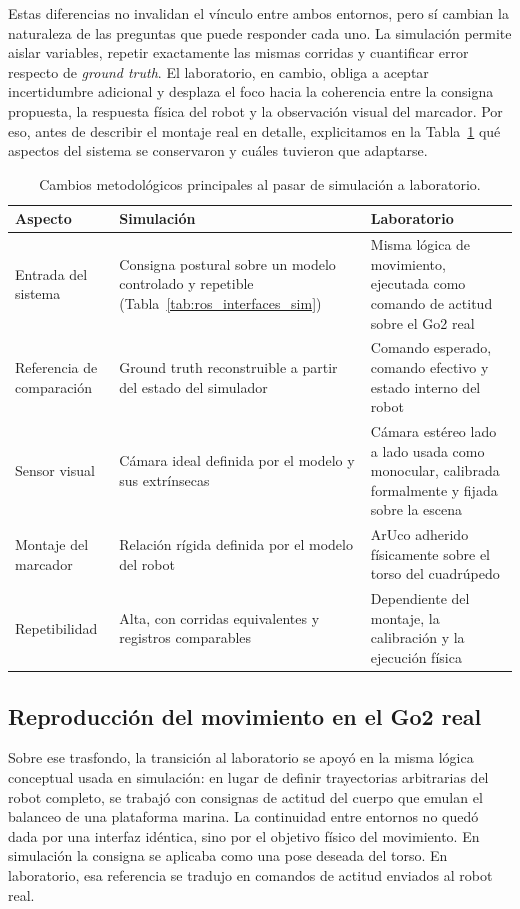 \documentclass[12pt,a4paper]{report}
\begin{document}
Estas diferencias no invalidan el vínculo entre ambos entornos, pero sí cambian
la naturaleza de las preguntas que puede responder cada uno. La simulación
permite aislar variables, repetir exactamente las mismas corridas y cuantificar
error respecto de \textit{ground truth}. El laboratorio, en cambio, obliga a aceptar
incertidumbre adicional y desplaza el foco hacia la coherencia entre la consigna
propuesta, la respuesta física del robot y la observación visual del marcador.
Por eso, antes de describir el montaje real en detalle, explicitamos en la
Tabla~\ref{tab:method_sim_to_lab} qué aspectos del sistema se conservaron y
cuáles tuvieron que adaptarse.

\begin{table}[H]
\centering
\caption{Cambios metodológicos principales al pasar de simulación a laboratorio.}
\label{tab:method_sim_to_lab}
\begin{tabular}{p{}p{}p{}}
\toprule
Aspecto & Simulación & Laboratorio \\
\midrule
Entrada del sistema & Consigna postural sobre un modelo controlado y repetible (Tabla~\ref{tab:ros_interfaces_sim}) & Misma lógica de movimiento, ejecutada como comando de actitud sobre el Go2 real \\
Referencia de comparación & Ground truth reconstruible a partir del estado del simulador & Comando esperado, comando efectivo y estado interno del robot \\
Sensor visual & Cámara ideal definida por el modelo y sus extrínsecas & Cámara estéreo lado a lado usada como monocular, calibrada formalmente y fijada sobre la escena \\
Montaje del marcador & Relación rígida definida por el modelo del robot & ArUco adherido físicamente sobre el torso del cuadrúpedo \\
Repetibilidad & Alta, con corridas equivalentes y registros comparables & Dependiente del montaje, la calibración y la ejecución física \\
\bottomrule
\end{tabular}
\end{table}

\subsection{Reproducción del movimiento en el Go2 real}

Sobre ese trasfondo, la transición al laboratorio se apoyó en la misma lógica
conceptual usada en simulación: en lugar de definir trayectorias arbitrarias del
robot completo, se trabajó con consignas de actitud del cuerpo que emulan el
balanceo de una plataforma marina. La continuidad entre entornos no quedó dada
por una interfaz idéntica, sino por el objetivo físico del movimiento. En
simulación la consigna se aplicaba como una pose deseada del torso. En
laboratorio, esa referencia se tradujo en comandos de actitud enviados al robot
real.
\end{document}
